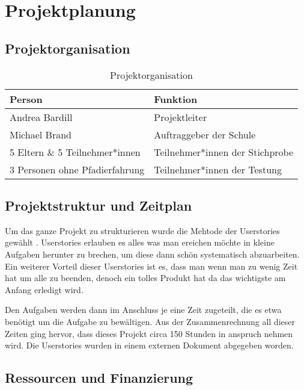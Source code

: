 
\chapter{Projektplanung}

\section{Projektorganisation}
\begin{center}
\begin{table}[h]
\begin{tabularx}{\textwidth}{X|X}
    \textbf{Person} & \textbf{Funktion} \\ \hline
    Andrea Bardill & Projektleiter \\
    Michael Brand & Auftraggeber der Schule \\
    5 Eltern \& 5 Teilnehmer*innen & Teilnehmer*innen der Stichprobe \\
    3 Personen ohne Pfadierfahrung & Teilnehmer*innen der Testung
\end{tabularx}
\caption{Projektorganisation}
\end{table}
\end{center}

\section{Projektstruktur und Zeitplan}
Um das ganze Projekt zu strukturieren wurde die Mehtode der Userstories gewählt \cite{userstories}. Userstories erlauben es alles was man ereichen möchte in kleine Aufgaben herunter zu brechen, um diese dann schön systematisch abzuarbeiten. Ein weiterer Vorteil dieser Userstories ist es, dass man wenn man zu wenig Zeit hat um alle zu beenden, denoch ein tolles Produkt hat da das wichtigste am Anfang erledigt wird. \par Den Aufgaben werden dann im Anschluss je eine Zeit zugeteilt, die es etwa benötigt um die Aufgabe zu bewältigen. Aus der Zusammenrechnung all dieser Zeiten ging hervor, dass dieses Projekt circa 150 Stunden in anspruch nehmen wird. Die Userstories wurden in einem externen Dokument abgegeben worden.
\newpage
\section{Ressourcen und Finanzierung}

